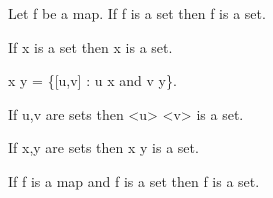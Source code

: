 \documentclass[a4paper,draft]{amsproc}
\begin{document}
\begin{forthel}

\begin{axiom}[V]
Let f be a map. If \domain f is a set then \range f is a set.
\end{axiom}

\begin{axiom}[VI]
If x is a set then \bigcup x is a set.
\end{axiom}

\begin{definition}[72]
 x \times y = \{[u,v] : u \in x and v \in y\}.
\end{definition}

\begin {theorem}[73]
If u,v are sets then <u> \times <v> is a set.
\end{theorem}

\begin{theorem}[74]
If x,y are sets then x \times y is a set.
\end{theorem}

\begin{theorem}[75]
If f is a map and \domain f is a set 
then f is a set.\end{theorem}


\end{forthel}
\end{document}
